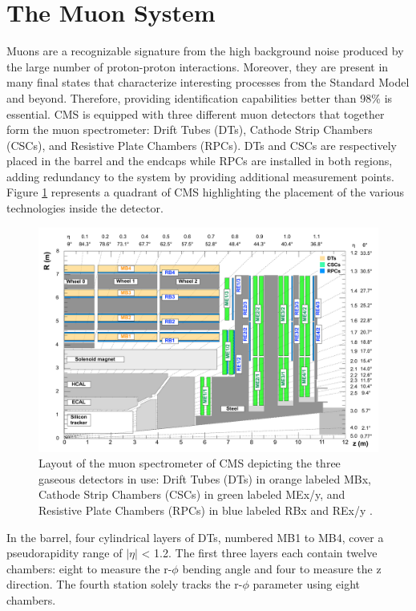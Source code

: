   \section{The Muon System}

    Muons are a recognizable signature from the high background noise produced by the large number of proton-proton interactions. Moreover, they are present in many final states that characterize interesting processes from the Standard Model and beyond. Therefore, providing identification capabilities better than 98\% is essential. CMS is equipped with three different muon detectors that together form the muon spectrometer: Drift Tubes (DTs), Cathode Strip Chambers (CSCs), and Resistive Plate Chambers (RPCs). DTs and CSCs are respectively placed in the barrel and the endcaps while RPCs are installed in both regions, adding redundancy to the system by providing additional measurement points. Figure \ref{fig:I-3-muons} represents a quadrant of CMS highlighting the placement of the various technologies inside the detector. \\

    \begin{figure}[b!]
      \centering
      \includegraphics[width=\textwidth]{img/I-3-cms/muons.pdf}
      \caption{Layout of the muon spectrometer of CMS depicting the three gaseous detectors in use: Drift Tubes (DTs) in orange labeled MBx, Cathode Strip Chambers (CSCs) in green labeled MEx/y, and Resistive Plate Chambers (RPCs) in blue labeled RBx and REx/y \cite{1748-0221-3-08-S08004}.}
      \label{fig:I-3-muons}
    \end{figure}

    In the barrel, four cylindrical layers of DTs, numbered MB1 to MB4, cover a pseudorapidity range of $ | \eta | $ < 1.2. The first three layers each contain twelve chambers: eight to measure the r-$\phi$ bending angle and four to measure the z direction. The fourth station solely tracks the r-$\phi$ parameter using eight chambers. \\

